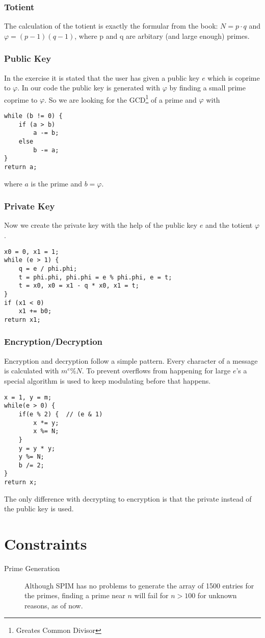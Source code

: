 \documentclass{report}
\begin{document}
\subsubsection{Totient}
The calculation of the totient is exactly the formular from the book: $N = p \cdot q$ and $\varphi = (p - 1)(q - 1)$, where p and q are arbitary (and large enough) primes.
\subsubsection{Public Key}
In the exercise it is stated that the user has given a public key $e$ which is coprime to $\varphi$. In our code the public key is generated with $\varphi$ by finding a small prime coprime to $\varphi$. So we are looking for the GCD\footnote{Greates Common Divisor} of a prime and $\varphi$ with
\begin{lstlisting}
while (b != 0) {
	if (a > b)
		a -= b;
	else
		b -= a;
}
return a;
\end{lstlisting}
where $a$ is the prime and $b=\varphi$.
\subsubsection{Private Key}
Now we create the private key with the help of the public key $e$ and the totient $\varphi$.
\begin{lstlisting}
x0 = 0, x1 = 1;
while (e > 1) {
	q = e / phi.phi;
	t = phi.phi, phi.phi = e % phi.phi, e = t;
	t = x0, x0 = x1 - q * x0, x1 = t;
}
if (x1 < 0)
	x1 += b0;
return x1;
\end{lstlisting}
\subsubsection{Encryption/Decryption}
Encryption and decryption follow a simple pattern. Every character of a message is calculated with $m^e\%N$. To prevent overflows from happening for large $e$'s a special algorithm is used to keep modulating before that happens.
\begin{lstlisting}
x = 1, y = m;
while(e > 0) {
	if(e % 2) {  // (e & 1)
		x *= y;
		x %= N;
	}
	y = y * y;
	y %= N;
	b /= 2;
}
return x;
\end{lstlisting}
The only difference with decrypting to encryption is that the private instead of the public key is used.
\section{Constraints}
\begin{description}
	\item[Prime Generation] Although SPIM has no problems to generate the array of 1500 entries for the primes, finding a prime near $n$ will fail for $n>100$ for unknown reasons, as of now.
\end{description}
\end{document}
